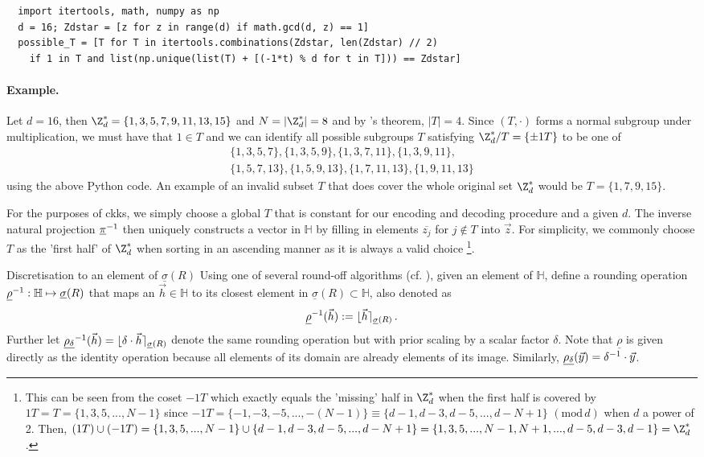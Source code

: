 \begin{verbatim}
  import itertools, math, numpy as np
  d = 16; Zdstar = [z for z in range(d) if math.gcd(d, z) == 1]
  possible_T = [T for T in itertools.combinations(Zdstar, len(Zdstar) // 2)
    if 1 in T and list(np.unique(list(T) + [(-1*t) % d for t in T])) == Zdstar]
\end{verbatim}

\paragraph{Example.}
Let $d = 16$, then $\Z_d^* = \{1, 3, 5, 7, 9, 11, 13, 15\}$ and $N = |\Z_d^*| = 8$ and by 's theorem, $|T| = 4$.
Since $(T, \cdot)$ forms a normal subgroup under multiplication, we must have that $1 \in T$ and we can identify all possible subgroups $T$ satisfying $\Z_d^* / T = \{\pm 1T\}$ to be one of
\begin{align*}
  \{1, 3, 5, 7\},
  \{1, 3, 5, 9\},
  \{1, 3, 7, 11\},
  \{1, 3, 9, 11\}, \\
  \{1, 5, 7, 13\},
  \{1, 5, 9, 13\},
  \{1, 7, 11, 13\},
  \{1, 9, 11, 13\}
\end{align*}
using the above Python code. An example of an invalid subset $T$ that does cover the whole original set $\Z_d^*$ would be $T = \{1, 7, 9, 15\}$.

For the purposes of \gls{ckks}, we simply choose a global $T$ that is constant for our encoding and decoding procedure and a given $d$.
The inverse natural projection $\underline{\pi}^{-1}$ then uniquely constructs a vector in $\mathbb{H}$ by filling in elements $\overline{z_j}$ for $j \notin T$ into $\vec{z}$.
For simplicity, we commonly choose $T$ as the 'first half' of $\Z_d^*$ when sorting in an ascending manner as it is always a valid choice
\footnote{
  This can be seen from the coset $-1T$ which exactly equals the 'missing' half in $\Z_d^*$ when the first half is covered by $1T = T = \{1, 3, 5, ..., N-1\}$ since $-1T = \{-1, -3, -5, ..., -(N-1)\} \equiv \{d-1, d-3, d-5, ..., d-N+1\}$ $(\text{mod}\, d)$ when $d$ a power of 2.
  Then, $(1T) \cup (-1T) = \{1, 3, 5, ..., N-1\} \cup \{d-1, d-3, d-5, ..., d-N+1\} = \{1, 3, 5, ..., N-1, N+1, ..., d-5, d-3, d-1\} = \Z_d^*$.
}.

\begin{definition}{Discretisation to an element of $\underline{\sigma}(R)$}{}
  Using one of several round-off algorithms (cf. \cite{2013-rlwe-toolkit}), given an element of $\mathbb{H}$, define a rounding operation $\underline{\rho}^{-1}: \mathbb{H} \mapsto \underline{\sigma}(R)$ that maps an $\vec{h} \in \mathbb{H}$ to its closest element in $\underline{\sigma}(R) \subset \mathbb{H}$, also denoted as
  $$\underline{\rho}^{-1}(\vec{h}) := \lfloor \vec{h} \rceil_{\underline{\sigma}(R)}\,.$$
  Further let $\underline{\rho_\delta}^{-1}(\vec{h}) = \lfloor \delta \cdot \vec{h} \rceil_{\underline{\sigma}(R)}$ denote the same rounding operation but with prior scaling by a scalar factor $\delta$.
  Note that $\underline{\rho}$ is given directly as the identity operation because all elements of its domain are already elements of its image. Similarly, $\underline{\rho_\delta}(\vec{y}) = \delta^{-1} \cdot \vec{y}$.
\end{definition}

